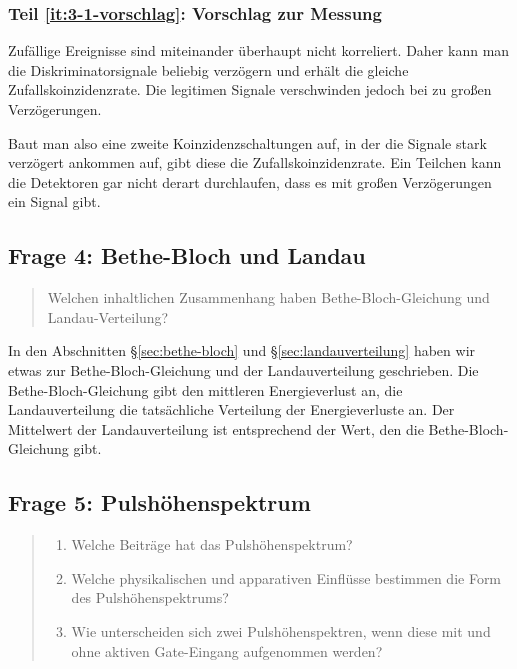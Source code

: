 \documentclass[11pt, ngerman, fleqn, DIV=15, headinclude, BCOR=2cm]{scrreprt}
\begin{document}
\subsubsection{Teil \ref{it:3-1-vorschlag}: Vorschlag zur Messung}

Zufällige Ereignisse sind miteinander überhaupt nicht korreliert. Daher kann
man die Diskriminatorsignale beliebig verzögern und erhält die gleiche
Zufallskoinzidenzrate. Die legitimen Signale verschwinden jedoch bei zu großen
Verzögerungen.

Baut man also eine zweite Koinzidenzschaltungen auf, in der die Signale stark
verzögert ankommen auf, gibt diese die Zufallskoinzidenzrate. Ein Teilchen kann
die Detektoren gar nicht derart durchlaufen, dass es mit großen Verzögerungen
ein Signal gibt.

\subsection{Frage 4: Bethe-Bloch und Landau}

\begin{quote}
    Welchen inhaltlichen Zusammenhang haben Bethe-Bloch-Gleichung und
    Landau-Verteilung?
\end{quote}

In den Abschnitten §\ref{sec:bethe-bloch} und §\ref{sec:landauverteilung} haben
wir etwas zur Bethe-Bloch-Gleichung und der Landauverteilung geschrieben. Die
Bethe-Bloch-Gleichung gibt den mittleren Energieverlust an, die
Landauverteilung die tatsächliche Verteilung der Energieverluste an. Der
Mittelwert der Landauverteilung ist entsprechend der Wert, den die
Bethe-Bloch-Gleichung gibt.

\subsection{Frage 5: Pulshöhenspektrum}

\begin{quote}
    \begin{enumerate}
        \item
            \label{it:1-5-beitrag}
            Welche Beiträge hat das Pulshöhenspektrum?

        \item
            \label{it:1-5-einfluss}
            Welche physikalischen und apparativen Einflüsse bestimmen die Form
            des Pulshöhenspektrums?

        \item
            \label{it:1-5-unterschied}
            Wie unterscheiden sich zwei Pulshöhenspektren, wenn diese mit und
            ohne aktiven Gate-Eingang aufgenommen werden?
    \end{enumerate}
\end{quote}
\end{document}
